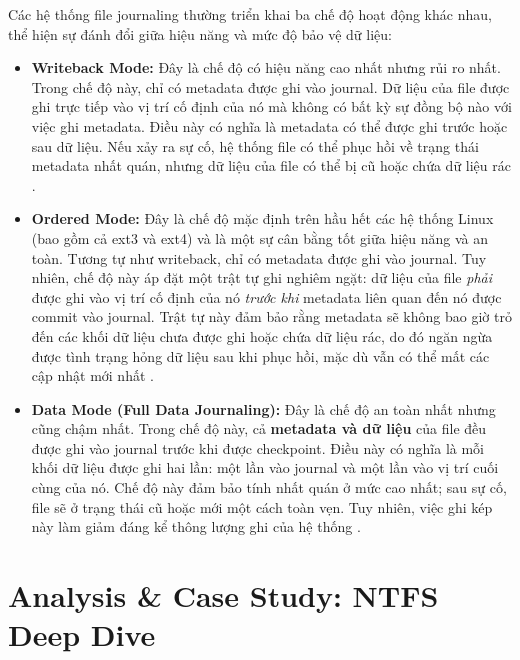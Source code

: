 \documentclass[12pt]{article}
\begin{document}
Các hệ thống file journaling thường triển khai ba chế độ hoạt động khác nhau, thể hiện sự đánh đổi giữa hiệu năng và mức độ bảo vệ dữ liệu:
\begin{itemize}
    \item \textbf{Writeback Mode:} Đây là chế độ có hiệu năng cao nhất nhưng rủi ro nhất. Trong chế độ này, chỉ có metadata được ghi vào journal. Dữ liệu của file được ghi trực tiếp vào vị trí cố định của nó mà không có bất kỳ sự đồng bộ nào với việc ghi metadata. Điều này có nghĩa là metadata có thể được ghi trước hoặc sau dữ liệu. Nếu xảy ra sự cố, hệ thống file có thể phục hồi về trạng thái metadata nhất quán, nhưng dữ liệu của file có thể bị cũ hoặc chứa dữ liệu rác \parencite{Jones2008Anatomy}.

    \item \textbf{Ordered Mode:} Đây là chế độ mặc định trên hầu hết các hệ thống Linux (bao gồm cả ext3 và ext4) và là một sự cân bằng tốt giữa hiệu năng và an toàn. Tương tự như writeback, chỉ có metadata được ghi vào journal. Tuy nhiên, chế độ này áp đặt một trật tự ghi nghiêm ngặt: dữ liệu của file \textit{phải} được ghi vào vị trí cố định của nó \textit{trước khi} metadata liên quan đến nó được commit vào journal. Trật tự này đảm bảo rằng metadata sẽ không bao giờ trỏ đến các khối dữ liệu chưa được ghi hoặc chứa dữ liệu rác, do đó ngăn ngừa được tình trạng hỏng dữ liệu sau khi phục hồi, mặc dù vẫn có thể mất các cập nhật mới nhất \parencite{Prabhakaran2005journaling}.

    \item \textbf{Data Mode (Full Data Journaling):} Đây là chế độ an toàn nhất nhưng cũng chậm nhất. Trong chế độ này, cả \textbf{metadata và dữ liệu} của file đều được ghi vào journal trước khi được checkpoint. Điều này có nghĩa là mỗi khối dữ liệu được ghi hai lần: một lần vào journal và một lần vào vị trí cuối cùng của nó. Chế độ này đảm bảo tính nhất quán ở mức cao nhất; sau sự cố, file sẽ ở trạng thái cũ hoặc mới một cách toàn vẹn. Tuy nhiên, việc ghi kép này làm giảm đáng kể thông lượng ghi của hệ thống \parencite{Jones2008Anatomy}.
\end{itemize}




\section{Analysis \& Case Study: NTFS Deep Dive}
\end{document}
